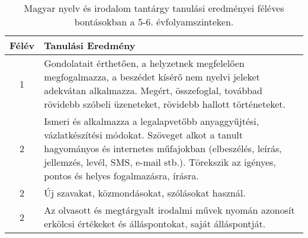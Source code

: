             \clearpage

       
           \begin{longtable}{c | p{12cm} }
            \caption[Magyar nyelv és irodalom 5-6.]{Magyar nyelv és irodalom tantárgy tanulási eredményei féléves bontásokban a 5-6. évfolyamszinteken. }  \\

            \textbf{Félév} & \textbf{Tanulási Eredmény} \\
            \hline
            \endhead
                                
                                          1 &  Gondolatait érthetően, a helyzetnek megfelelően megfogalmazza, a beszédet kísérő nem nyelvi jeleket adekvátan alkalmazza. Megért, összefoglal, továbbad rövidebb szóbeli üzeneteket, rövidebb hallott történeteket. \\ \hline
                                      
                                
                                          2 &  Ismeri és alkalmazza a legalapvetőbb anyaggyűjtési, vázlatkészítési módokat. Szöveget alkot a tanult hagyományos és internetes műfajokban (elbeszélés, leírás, jellemzés, levél, SMS, e-mail stb.). Törekszik az igényes, pontos és helyes fogalmazásra, írásra. \\ \hline
                                          2 &  Új szavakat, közmondásokat, szólásokat használ. \\ \hline
                                          2 &  Az olvasott és megtárgyalt irodalmi művek nyomán azonosít erkölcsi értékeket és álláspontokat, saját álláspontját. \\ \hline
                                      

\end{longtable}
